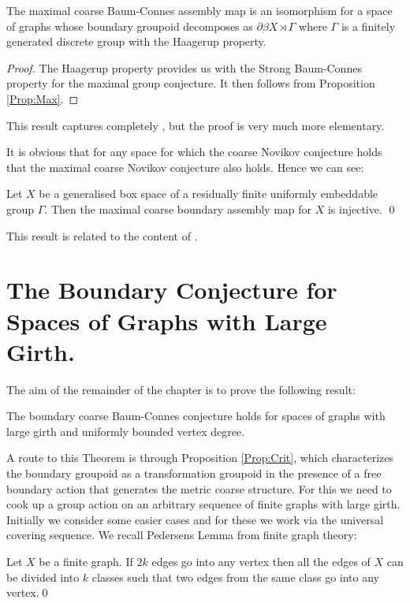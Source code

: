 \begin{conjecture}
\begin{theorem}
The maximal coarse Baum-Connes assembly map is an isomorphism for a space of graphs whose boundary groupoid decomposes as $\partial\beta X \rtimes \Gamma$ where $\Gamma$ is a finitely generated discrete group with the Haagerup property.
\end{theorem}
\begin{proof}
The Haagerup property provides us with the Strong Baum-Connes property for the maximal group conjecture. It then follows from Proposition \ref{Prop:Max}.
\end{proof}

This result captures completely \cite[Corollary 4.18]{MR2568691}, but the proof is very much more elementary.

It is obvious that for any space for which the coarse Novikov conjecture holds that the maximal coarse Novikov conjecture also holds. Hence we can see:

\begin{theorem}
Let $X$ be a generalised box space of a residually finite uniformly embeddable group $\Gamma$. Then the maximal coarse boundary assembly map for $X$ is injective. \qed
\end{theorem}

This result is related to the content of \cite[Theorem 5.1]{MR2431253} .

\section{The Boundary Conjecture for Spaces of Graphs with Large Girth.}\label{Sect:MR}
The aim of the remainder of the chapter is to prove the following result:
\begin{theorem}
The boundary coarse Baum-Connes conjecture holds for spaces of graphs with large girth and uniformly bounded vertex degree.
\end{theorem}

A route to this Theorem is through Proposition \ref{Prop:Crit}, which characterizes the boundary groupoid as a transformation groupoid in the presence of a free boundary action that generates the metric coarse structure. For this we need to cook up a group action on an arbitrary sequence of finite graphs with large girth. Initially we consider some easier cases and for these we work via the universal covering sequence. We recall Pedersens Lemma \cite[Theorem 7, Chapter XI]{MR1035708} from finite graph theory:

\begin{lemma}\label{Lem:PL}
Let $X$ be a finite graph. If $2k$ edges go into any vertex then all the edges of $X$ can be divided into $k$ classes such that two edges from the same class go into any vertex.\qed
\end{lemma}


\end{conjecture}
